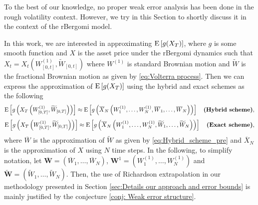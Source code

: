 To the best of our knowledge, no proper weak error
analysis has been done in the rough volatility context. However, we try in this Section  to shortly discuss it in the context of the rBergomi model.

In this work, we are interested in approximating $\mathrm{E}\left[g(X_T)\right]$, where $g$ is some smooth function and $X$ is the asset price under the rBergomi dynamics such that $X_t=X_t(W^{(1)}_{[0,t]},\widetilde{W}_{[0,t]})$ where $W^{(1)}$ is standard Brownian motion and  $\widetilde{W}$ is the fractional Brownian motion as given by \eqref{eq:Volterra process}.  Then we can express the approximation of $\mathrm{E}\left[g(X_T)\right]$  using the  hybrid and exact schemes as the following 
\begin{align*}
\mathrm{E}\left[g\left(X_T\left(W^{(1)}_{[0,T]},\widetilde{W}_{[0,T]}\right)\right)\right] \approx \mathrm{E}\left[g\left(\overline{X}_N\left(W^{(1)}_1,\dots,W^{(1)}_N, \overline{W}_1, \dots,\overline{W}_N\right)\right)\right] \quad \textbf{(Hybrid  scheme)},
\end{align*}
\begin{align*}
\mathrm{E}\left[g\left(X_T\left(W^{(1)}_{[0,T]},\widetilde{W}_{[0,T]}\right)\right)\right] \approx \mathrm{E}\left[g\left(\overline{X}_N\left(W^{(1)}_1,\dots,W^{(1)}_N, \widetilde{W}_1, \dots,\widetilde{W}_N\right)\right)\right] \quad \textbf{(Exact  scheme)},
\end{align*}
where $\overline{W}$ is the approximation of $\widetilde{W}$  as given by \eqref{eq:Hybrid_scheme_pre} and $\overline{X}_N$ is the approximation of $X$ using $N$ time steps. In the following, to simplify notation, let  $\overline{\mathbf{W}}=(\overline{W}_1,\dots,\overline{W}_N)$, $\mathbf{W}^{1}=(W^{(1)}_1,\dots,W^{(1)}_N)$ and $\widetilde{\mathbf{W}}=(\widetilde{W}_1,\dots,\widetilde{W}_N)$. Then, the use of Richardson extrapolation in our  methodology presented in Section \ref{sec:Details our approach and error bounds} is mainly justified  by the conjecture \ref{conj: Weak error structure}. 
